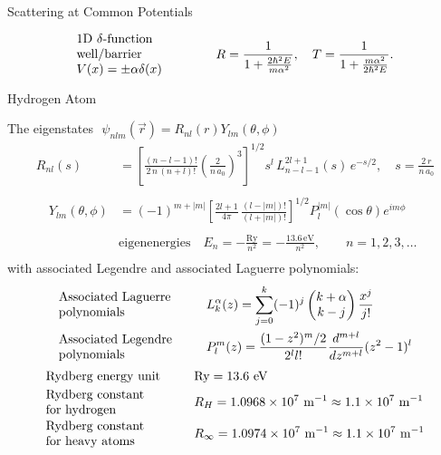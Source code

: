 \documentclass{article}[a4paper]
\begin{document}
\begin{minipage}[t]{0.5\textwidth}
  \noindent
  \begin{center}
    \large{Scattering at Common Potentials}
  \end{center}
  \begin{align*}
    &\textrm{\parbox{0.28\textwidth}{1D $\delta$-function \\ well/barrier\\ $V(x) = \pm \alpha \delta(x)$}}    & ~&R = \frac{1}{1 + \frac{2\hbar^2E}{m\alpha^2}},\quad T = \frac{1}{1 + \frac{m\alpha^2}{2\hbar^2E}}.\\
  \end{align*}
  \begin{center}
    \large{Hydrogen Atom}
  \end{center}
  \noindent The eigenstates $\,\,\psi_{nlm}(\vec{r}) = R_{nl}(r) Y_{lm}(\theta, \phi)$
  \noindent
  \begin{align*}
  R_{nl}(s) &= \left[ \frac{(n - l - 1)!}{2\,n\,(n+l)!} \left(\frac{2}{n\,a_0}\right)^3 \right]^{1/2} s^l \, L^{2l+1}_{n-l-1}(s) \, e^{-s/2}, \quad s = \frac{2\,r}{n\,a_0}\\
  &\\
  \quad Y_{lm}(\theta, \phi) &= (-1)^{m+|m|} \left[ \frac{2l + 1}{4\pi} \,\frac{(l - |m|)!}{(l + |m|)!} \right]^{1/2} P^{|m|}_l(\cos\theta) e^{im\phi} \quad\\
  &\\
  &\textrm{eigenenergies}\quad E_n = -\frac{\textrm{Ry}}{n^2} = -\frac{13.6 \, \textrm{eV}}{n^2}, \qquad n = 1, 2, 3, \dots \\
  \end{align*}%
  with associated Legendre and associated Laguerre polynomials:
  \begin{align*}
    &\textrm{\parbox{0.3\textwidth}{Associated Laguerre \\ polynomials}} & ~&L_k^{\alpha}(z) = \sum_{j = 0}^{k}(-1)^j \begin{pmatrix}k+\alpha\\ k - j\end{pmatrix} \frac{x^j}{j!}\\
    &\textrm{\parbox{0.3\textwidth}{Associated Legendre \\ polynomials}} & ~&P^{m}_l(z) = \frac{(1-z^2)^m/2}{2^l l!} \frac{d^{m+l}}{dz^{m+l}}(z^2 - 1)^l\\
  \end{align*}
  \begin{align*}
    &\textrm{\parbox{0.3\textwidth}{Rydberg energy unit}} & ~&\textrm{Ry} = 13.6~\textrm{eV}\\
    &\textrm{\parbox{0.3\textwidth}{Rydberg constant \\ for hydrogen}} & ~&R_H = 1.0968 \times 10^7~\textrm{m}^{-1} \approx 1.1\times 10^7~\textrm{m}^{-1}\\
    &\textrm{\parbox{0.3\textwidth}{Rydberg constant \\ for heavy atoms}} & ~&R_\infty = 1.0974 \times 10^7~\textrm{m}^{-1} \approx 1.1\times 10^7~\textrm{m}^{-1}\\
    &&&\\
  \end{align*}%
\end{minipage}%
%
%
\end{document}
